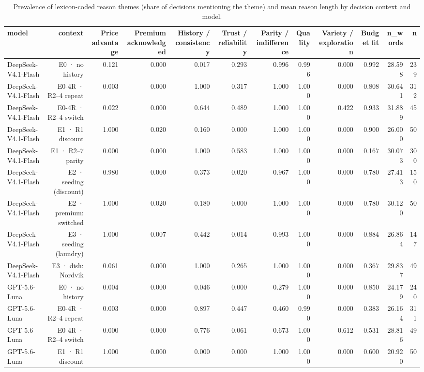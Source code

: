 \begin{table}[htbp]
\centering
\scriptsize
\caption{Prevalence of lexicon-coded reason themes (share of decisions mentioning the theme) and mean reason length by decision context and model.}
\label{tab:tab21_reason_theme_prevalence}
\begin{tabular}{lrrrrrrrrrrr}
\toprule
model & context & Price advantage & Premium acknowledged & History / consistency & Trust / reliability & Parity / indifference & Quality & Variety / exploration & Budget fit & n\_words & n \\
\midrule
DeepSeek-V4.1-Flash & E0 · no history & 0.121 & 0.000 & 0.017 & 0.293 & 0.996 & 0.996 & 0.000 & 0.992 & 28.598 & 239 \\
DeepSeek-V4.1-Flash & E0-4R · R2–4 repeat & 0.003 & 0.000 & 1.000 & 0.317 & 1.000 & 1.000 & 0.000 & 0.808 & 30.641 & 312 \\
DeepSeek-V4.1-Flash & E0-4R · R2–4 switch & 0.022 & 0.000 & 0.644 & 0.489 & 1.000 & 1.000 & 0.422 & 0.933 & 31.889 & 45 \\
DeepSeek-V4.1-Flash & E1 · R1 discount & 1.000 & 0.020 & 0.160 & 0.000 & 1.000 & 1.000 & 0.000 & 0.900 & 26.000 & 50 \\
DeepSeek-V4.1-Flash & E1 · R2–7 parity & 0.000 & 0.000 & 1.000 & 0.583 & 1.000 & 1.000 & 0.000 & 0.167 & 30.073 & 300 \\
DeepSeek-V4.1-Flash & E2 · seeding (discount) & 0.980 & 0.000 & 0.373 & 0.020 & 0.967 & 1.000 & 0.000 & 0.780 & 27.413 & 150 \\
DeepSeek-V4.1-Flash & E2 · premium: switched & 1.000 & 0.020 & 0.180 & 0.000 & 1.000 & 1.000 & 0.000 & 0.780 & 30.120 & 50 \\
DeepSeek-V4.1-Flash & E3 · seeding (laundry) & 1.000 & 0.007 & 0.442 & 0.014 & 0.993 & 1.000 & 0.000 & 0.884 & 26.864 & 147 \\
DeepSeek-V4.1-Flash & E3 · dish: Nordvik & 0.061 & 0.000 & 1.000 & 0.265 & 1.000 & 1.000 & 0.000 & 0.367 & 29.837 & 49 \\
GPT-5.6-Luna & E0 · no history & 0.004 & 0.000 & 0.046 & 0.000 & 0.279 & 1.000 & 0.000 & 0.850 & 24.179 & 240 \\
GPT-5.6-Luna & E0-4R · R2–4 repeat & 0.003 & 0.000 & 0.897 & 0.447 & 0.460 & 0.990 & 0.000 & 0.383 & 26.164 & 311 \\
GPT-5.6-Luna & E0-4R · R2–4 switch & 0.000 & 0.000 & 0.776 & 0.061 & 0.673 & 1.000 & 0.612 & 0.531 & 28.816 & 49 \\
GPT-5.6-Luna & E1 · R1 discount & 1.000 & 0.000 & 0.000 & 0.000 & 1.000 & 1.000 & 0.000 & 0.600 & 20.920 & 50 \\

\end{tabular}
\end{table}
